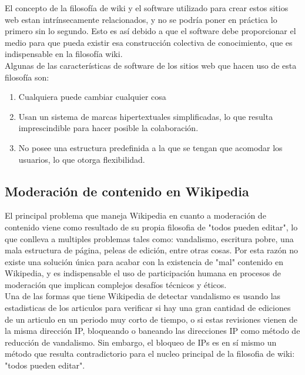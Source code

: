         El concepto de la filosofía de wiki y el software utilizado para crear estos sitios web estan intrínsecamente relacionados, y no se podría poner en práctica lo primero sin lo segundo. Esto es así debido a que el software debe proporcionar el medio para que pueda existir esa construcción colectiva de conocimiento, que es indispensable en la filosofía wiki.\\
        
        Algunas de las características de software de los sitios web que hacen uso de esta filosofía son: 
    
        \begin{enumerate}
            \item Cualquiera puede cambiar cualquier cosa
            \item Usan un sistema de marcas hipertextuales simplificadas, lo que resulta imprescindible para hacer posible la colaboración.
            \item No posee una estructura predefinida a la que se tengan que acomodar los usuarios, lo que otorga flexibilidad.
        \end{enumerate}

    \subsection{Moderación de contenido en Wikipedia}

        \iffalse  \fi

        El principal problema que maneja Wikipedia en cuanto a moderación de contenido viene como resultado de su propia filosofia de "todos pueden editar", lo que conlleva a multiples problemas tales como: vandalismo, escritura pobre, una mala estructura de página, peleas de edición, entre otras cosas. Por esta razón no existe una solución única para acabar con la existencia de "mal" contenido en Wikipedia, y es indispensable el uso de participación humana en procesos de moderación que implican complejos desafíos técnicos y éticos.\\

        Una de las formas que tiene Wikipedia de detectar vandalismo es usando las estadisticas de los articulos para verificar si hay una gran cantidad de ediciones de un articulo en un periodo muy corto de tiempo, o si estas revisiones vienen de la misma dirección IP, bloqueando o baneando las direcciones IP como método de reducción de vandalismo. Sin embargo, el bloqueo de IPs es en sí mismo un método que resulta contradictorio para el nucleo principal de la filosofia de wiki: "todos pueden editar".

